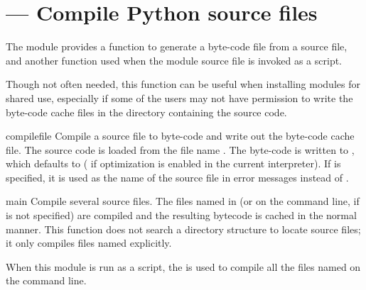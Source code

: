 \section{ ---
         Compile Python source files}





The  module provides a function to generate a
byte-code file from a source file, and another function used when the
module source file is invoked as a script.

Though not often needed, this function can be useful when installing
modules for shared use, especially if some of the users may not have
permission to write the byte-code cache files in the directory
containing the source code.


\begin{funcdesc}{compile}{file}
  Compile a source file to byte-code and write out the byte-code cache 
  file.  The source code is loaded from the file name .  The 
  byte-code is written to , which defaults to 
  \code{+}  ( if optimization is enabled in the
  current interpreter).  If  is specified, it is used as
  the name of the source file in error messages instead of . 
\end{funcdesc}


\begin{funcdesc}{main}{}
  Compile several source files.  The files named in  (or on
  the command line, if  is not specified) are compiled and
  the resulting bytecode is cached in the normal manner.  This
  function does not search a directory structure to locate source
  files; it only compiles files named explicitly.
\end{funcdesc}

When this module is run as a script, the  is used to
compile all the files named on the command line.

\begin{seealso}
\end{seealso}

